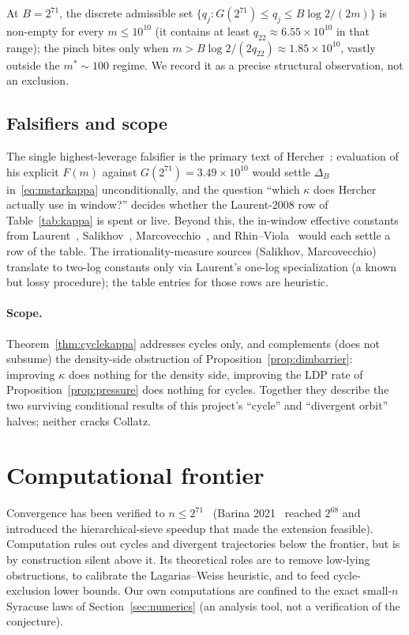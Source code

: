 \documentclass[11pt]{amsart}
\theoremstyle{definition}
\theoremstyle{remark}
\begin{document}
At $B=2^{71}$, the discrete admissible set $\{q_j:G(2^{71})\le q_j\le B\log 2/(2m)\}$ is
non-empty for every $m\le 10^{10}$ (it contains at least $q_{22}\approx 6.55\times 10^{10}$ in
that range); the pinch bites only when $m>B\log 2/(2q_{22})\approx 1.85\times 10^{10}$,
vastly outside the $m^*\sim 100$ regime. We record it as a precise structural observation,
not an exclusion.

\subsection{Falsifiers and scope}

The single highest-leverage falsifier is the primary text of Hercher~\citep{hercher2023}:
evaluation of his explicit $F(m)$ against $G(2^{71})=3.49\times 10^{10}$ would settle $\Delta_B$
in~\eqref{eq:mstarkappa} unconditionally, and the question ``which $\kappa$ does Hercher actually
use in window?'' decides whether the Laurent-2008 row of Table~\ref{tab:kappa} is spent or live.
Beyond this, the in-window effective constants from Laurent~\citep{laurent2008},
Salikhov~\citep{salikhov2007}, Marcovecchio~\citep{marcovecchio2009}, and
Rhin--Viola~\citep{rhinviola1996} would each settle a row of the table. The irrationality-measure
sources (Salikhov, Marcovecchio) translate to two-log constants only via Laurent's one-log
specialization (a known but lossy procedure); the table entries for those rows are heuristic.

\paragraph{Scope.}
Theorem~\ref{thm:cyclekappa} addresses cycles only, and complements (does not subsume) the
density-side obstruction of Proposition~\ref{prop:dimbarrier}: improving $\kappa$ does nothing
for the density side, improving the LDP rate of Proposition~\ref{prop:pressure} does nothing
for cycles. Together they describe the two surviving conditional results of this project's
``cycle'' and ``divergent orbit'' halves; neither cracks Collatz.

\section{Computational frontier}
\label{sec:computational}

Convergence has been verified to $n\le 2^{71}$~\citep{barina2025} %
(Barina 2021~\citep{barina2021} reached $2^{68}$ and introduced the hierarchical-sieve speedup that made
the extension feasible). Computation rules out cycles and divergent trajectories below the frontier, but
is by construction silent above it. Its theoretical roles are to remove low-lying obstructions, to
calibrate the Lagarias--Weiss heuristic, and to feed cycle-exclusion lower bounds. Our own computations
are confined to the exact small-$n$ Syracuse laws of Section~\ref{sec:numerics} (an analysis tool, not a
verification of the conjecture).
\end{document}
